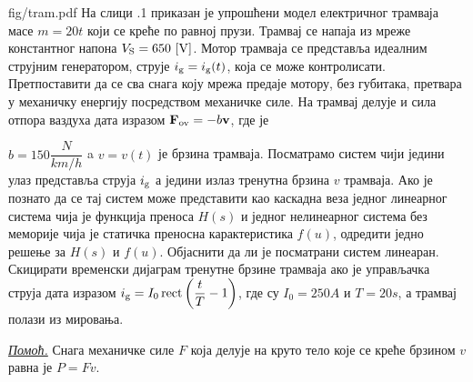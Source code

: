 \newpage
\begin{slikaDesno}[0.83]{fig/tram.pdf}
    \PID 
На слици \ID.1 приказан је упрошћени модел 
електричног трамваја масе $m = 20\unit{t}$ који
се креће по равној прузи. Трамвај 
се напаја из мреже константног напона $V_{\rm S} = 
650\,\left[\mathrm{V}\right]$. Мотор трамваја се представља 
идеалним струјним генератором, струје 
$i_{\rm g} = i_{\rm g}(t)$, која се 
може контролисати. Претпоставити да се сва снага
коју мрежа предаје мотору, без губитака, претвара у механичку 
енергију посредством механичке силе. 
На трамвај делује и сила отпора ваздуха
дата изразом ${\bf F}_{\rm ov} = -b {\bf v}$, где је\linebreak 
\vspace*{-3mm}
\end{slikaDesno} 
$b = 150\unit{\dfrac{N}{km/h}}$ a 
$v = v(t)$ је брзина трамваја.
Посматрамо систем чији једини
улаз представља струја $i_{\rm g}$ а једини
излаз тренутна брзина $v$ трамваја. 
Ако је познато да се тај систем може представити 
као каскадна веза једног линеарног система 
чија је функција преноса $H(s)$ и једног 
нелинеарног система без меморије чија је 
статичка преносна карактеристика $f(u)$,
одредити једно решење за 
$H(s)$ и $f(u)$. Објаснити да ли 
је посматрани систем линеаран.
Скицирати временски дијаграм тренутне брзине 
трамваја ако је управљачка струја дата изразом
$i_{\rm g} = I_0 \operatorname{rect}
\left( \dfrac{t}{T} - 1 \right)$,
где су $I_0 = 250\unit{A}$ и $T = 20\unit{s}$,
а трамвај полази из мировања.
\vspace*{1mm}

\noindent
\textit{\underline{Помоћ.}} Снага механичке силе $F$ која 
делује на круто тело које се креће брзином $v$ 
равна је $P = Fv$. \\

